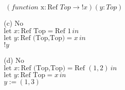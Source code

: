 \documentclass{article}
\newcommand{\step}[2]{{\tt #1} $\longrightarrow$ {\tt #2}}
\newcommand{\inferrule}[3]{\infrule[#1]{\mbox{#2}}{\mbox{#3}}}
\newcommand{\inferax}[2]{\infrule[#1]{\mbox{}}{\mbox{#2}}}
\begin{document}
\begin{description}
\begin{enumerate}
                $\ (function \text{ x}: \text{Ref }Top \rightarrow !x)(y:Top)$
                \item[(c)] {No}\\
                $\text{let } x: \text{Ref Top} = \text{Ref } 1 \, in $\\
                $\text{let } y: \text{Ref (Top,Top)} = x\, in$\\
                $!y$
                \item[(d)] {No}\\
                $\text{let } x: \text{Ref (Top,Top)} = \text{Ref } (1,2) \, in $\\
                $\text{let } y: \text{Ref Top} = x \,in$\\
                $y:=(1,3)$\\
            \end{enumerate}
    \end{description}

%
%
%
%
%
%
%
%
%
%
%
%
%
%
%
%
%
%
%
\end{document}

